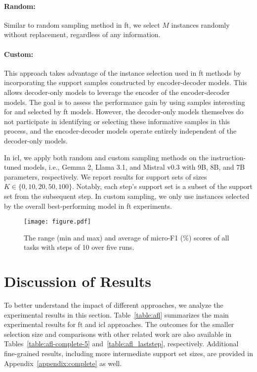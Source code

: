 \documentclass[11pt]{article}
\theoremstyle{definition}
\begin{document}
\paragraph{Random:} Similar to random sampling method in \gls*{ft}, we select $M$ instances randomly without replacement, regardless of any information.

\paragraph{Custom:} This approach takes advantage of the instance selection used in \gls*{ft} methods by incorporating the support samples constructed by encoder-decoder models. This allows decoder-only models to leverage the encoder of the encoder-decoder models. The goal is to assess the performance gain by using samples interesting for and selected by \gls*{ft} models. However, the decoder-only models themselves do not participate in identifying or selecting these informative samples in this process, and the encoder-decoder models operate entirely independent of the decoder-only models.

In \gls*{icl}, we apply both random and custom sampling methods on the instruction-tuned models, i.e.,  Gemma 2, Llama 3.1, and Mistral v0.3 with 9B, 8B, and 7B parameters, respectively. We report results for support sets of sizes $K \in \{0, 10, 20, 50, 100\}$. Notably, each step's support set is a subset of the support set from the subsequent step. In custom sampling, we only use instances selected by the overall best-performing model in \gls*{ft} experiments.


\begin{figure*} [htb]
    \centering
	\texttt{[image: figure.pdf]}
	\caption{The range (min and max) and average of micro-F1 (\%) scores of all tasks with steps of 10 over five runs.}
	\label{fig:graph}
\end{figure*}


\section{Discussion of Results} \label{sec:discussion}

To better understand the impact of different approaches, we analyze the experimental results in this section.
Table~\ref{table:afl} summarizes the main experimental results for \gls*{ft} and \gls*{icl} approaches. The outcomes for the smaller selection size and comparisons with other related work are also available in Tables~\ref{table:afl-complete-5} and~\ref{table:afl_laststep}, respectively.
Additional fine-grained results, including more intermediate support set sizes, are provided in Appendix~\ref{appendix:complete} as well.
\end{document}
